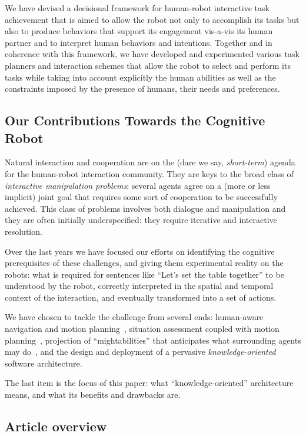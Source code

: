 \documentclass[preprint,12pt]{elsarticle}
\begin{document}
We have devised a decisional framework for human-robot interactive
task achievement that is aimed to allow the robot not only to
accomplish its tasks but also to produce behaviors that support its
engagement vis-a-vis its human partner and to interpret human
behaviors and intentions. 
Together and in coherence with this framework, we have developed
and experimented various task planners and interaction schemes that
allow the robot to select and perform its tasks while taking into
account explicitly the human abilities as well as the constraints
imposed by the presence of humans, their needs and preferences. 



\subsection{Our Contributions Towards the Cognitive Robot}

Natural interaction and cooperation are on the (dare we say,
\emph{short-term}) agenda for the human-robot interaction community. They are
keys to the broad class of \emph{interactive manipulation problems}: several
agents agree on a (more or less implicit) joint goal that requires some sort of
cooperation to be successfully achieved. This class of problems involves both
dialogue and manipulation and they are often initially underspecified: they
require iterative and interactive resolution.

Over the last years we have focused our efforts on identifying the cognitive
prerequisites of these challenges, and giving them experimental reality on the
robots: what is required for sentences like ``Let's set the table together''
to be understood by the robot, correctly interpreted in the spatial and
temporal context of the interaction, and eventually transformed into a set of
actions.

We have chosen to tackle the challenge from several ends: human-aware
navigation and motion planning~\cite{Mainprice2011}, situation assessment
coupled with motion planning~\cite{Mainprice2012}, projection of
``mightabilities'' that anticipates what surrounding agents may
do~\cite{Pandey2011}, and the design and deployment of a pervasive
\emph{knowledge-oriented} software architecture.

The last item is the focus of this paper: what ``knowledge-oriented''
architecture means, and what its benefits and drawbacks are.

\subsection{Article overview}
\end{document}
